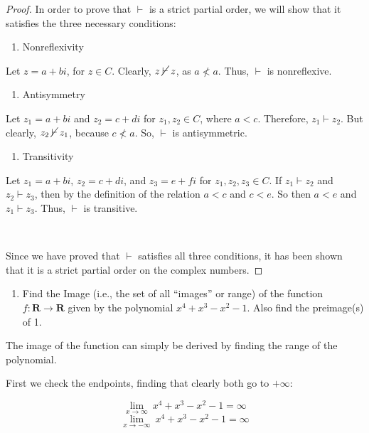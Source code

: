 \documentclass{article}
\begin{document}
\begin{proof}
    In order to prove that $\vdash$ is a strict partial order, we will show that it satisfies the three necessary conditions:

    \begin{enumerate}
        \item Nonreflexivity
    \end{enumerate}

    Let $z = a + bi$, for $z \in C$. Clearly, $z \:\cancel{\vdash}\: z$, as $a \not< a$. Thus, $\vdash$ is nonreflexive.

    \begin{enumerate}[resume]
        \item Antisymmetry
    \end{enumerate}

    Let $z_1 = a + bi$ and $z_2 = c + di$ for $z_1, z_2 \in C$, where $a < c$. Therefore, $z_1 \vdash z_2$. But clearly, $z_2 \:\cancel{\vdash}\: z_1$, because $c \not< a$. So, $\vdash$ is antisymmetric.

    \begin{enumerate}[resume]
        \item Transitivity
    \end{enumerate}

    Let $z_1 = a + bi$, $z_2 = c + di$, and $z_3 = e + fi$ for $z_1, z_2, z_3 \in C$. If $z_1 \vdash z_2$ and $z_2 \vdash z_3$, then by the definition of the relation $a < c$ and $c < e$. So then $a < e$ and $z_1 \vdash z_3$. Thus, $\vdash$ is transitive.

    \,

    Since we have proved that $\vdash$ satisfies all three conditions, it has been shown that it is a strict partial order on the complex numbers.
\end{proof}

\begin{enumerate}[resume]
    \item Find the Image (i.e., the set of all “images” or range) of the function $f:\textbf{R} \rightarrow \textbf{R}$ given by the polynomial $x^4 + x^3 - x^2 - 1$. Also find the preimage(s) of 1.
\end{enumerate}

The image of the function can simply be derived by finding the range of the polynomial.

First we check the endpoints, finding that clearly both go to $+\infty$:

\[\lim_{x\to\infty}\ x^4 + x^3 - x^2 - 1 = \infty\]
\[\lim_{x\to-\infty}\ x^4 + x^3 - x^2 - 1 = \infty\]
\end{document}
